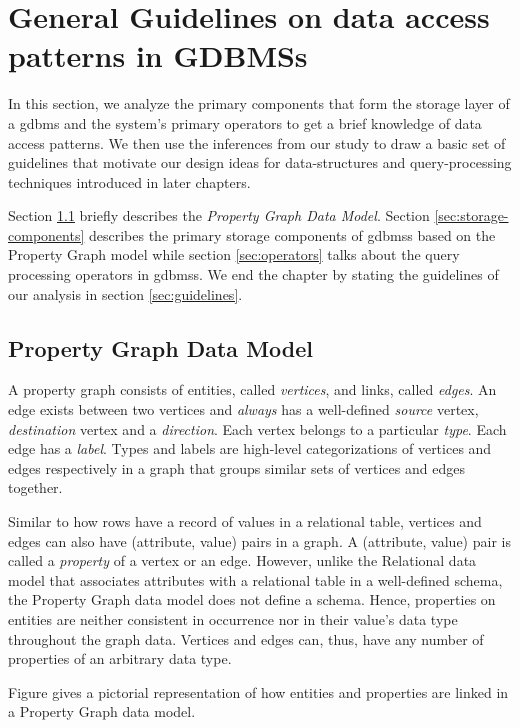 \chapter{General Guidelines on data access patterns in GDBMSs}
\label{c:guidelines}

In this section, we analyze the primary components that form the storage layer of a \gls{gdbms} and the system's primary operators to get a brief knowledge of data access patterns. We then use the inferences from our study to draw a basic set of guidelines that motivate our design ideas for data-structures and query-processing techniques introduced in later chapters.

Section \ref{sec:property-graph-data-model} briefly describes the \emph{Property Graph Data Model}. Section \ref{sec:storage-components} describes the primary storage components of \gls{gdbms}s based on the Property Graph model while section \ref{sec:operators} talks about the query processing operators in \gls{gdbms}s. We end the chapter by stating the guidelines of our analysis in section \ref{sec:guidelines}.

\section{Property Graph Data Model}
\label{sec:property-graph-data-model}

A property graph consists of entities, called \emph{vertices}, and links, called \emph{edges}. An edge  exists between two vertices and \emph{always} has a well-defined \emph{source} vertex, \emph{destination} vertex and a \emph{direction}. Each vertex belongs to a particular \emph{type}. Each edge has a \emph{label}. Types and labels are high-level categorizations of vertices and edges respectively in a graph that groups similar sets of vertices and edges together.

Similar to how rows have a record of values in a relational table, vertices and edges can also have (attribute, value) pairs in a graph. A (attribute, value) pair is called a \emph{property} of a vertex or an edge. However, unlike the Relational data model that associates attributes with a relational table in a well-defined schema, the Property Graph data model does not define a schema. Hence, properties on entities are neither consistent in occurrence nor in their value's data type throughout the graph data. Vertices and edges can, thus, have any number of properties of an arbitrary data type.

Figure \cite{property} gives a pictorial representation of how entities and properties are linked in a Property Graph data model.


